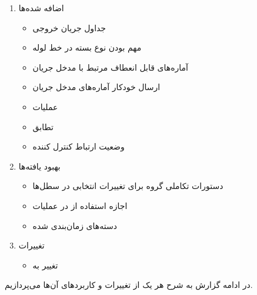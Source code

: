 \begin{enumerate}[label=\Alph*]
	\item 
اضافه شده‌ها
	\begin{itemize}[noitemsep,topsep=0pt,parsep=0pt,partopsep=0pt]
		\item جداول جریان خروجی
		\item مهم بودن نوع بسته در خط لوله
		\item آماره‌های قابل انعطاف مرتبط با مدخل جریان 
		\item ارسال خودکار آماره‌های مدخل جریان
		\item عملیات 
		\item تطابق 
		\item وضعیت ارتباط کنترل کننده
	\end{itemize}
	\item
بهبود یافته‌ها
	\begin{itemize}[noitemsep,topsep=0pt,parsep=0pt,partopsep=0pt]
		\item دستورات تکاملی گروه برای تغییرات انتخابی در سطل‌ها
		\item اجازه استفاده از  در عملیات 
		\item دسته‌های زمان‌بندی شده
	\end{itemize}
	\item
تغییرات
	\begin{itemize}[noitemsep,topsep=0pt,parsep=0pt,partopsep=0pt]
		\item تغییر  به 
	\end{itemize}
\end{enumerate}

در ادامه گزارش به شرح هر یک از تغییرات و کاربرد‌های آن‌ها می‌پردازیم.
\pagebreak


